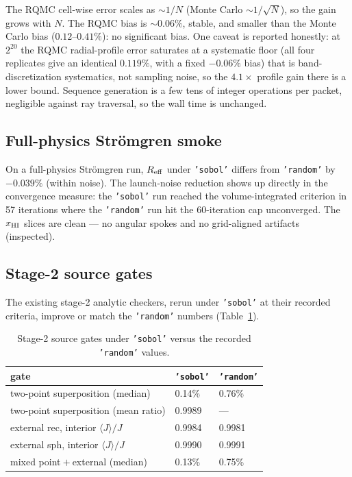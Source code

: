\documentclass[english,a4paper]{my_memo}
\newcommand{\code}[1]{\texttt{#1}}
\begin{document}
The RQMC cell-wise error scales as $\sim 1/N$ (Monte Carlo $\sim 1/\sqrt{N}$),
so the gain grows with $N$.  The RQMC bias is $\sim 0.06\%$, stable, and smaller
than the Monte Carlo bias ($0.12$--$0.41\%$): no significant bias.  One caveat is
reported honestly: at $2^{20}$ the RQMC radial-profile error saturates at a
systematic floor (all four replicates give an identical $0.119\%$, with a fixed
$-0.06\%$ bias) that is band-discretization systematics, not sampling noise, so
the $4.1\times$ profile gain there is a lower bound.  Sequence generation is a
few tens of integer operations per packet, negligible against ray traversal, so
the wall time is unchanged.

\subsection{Full-physics Str\"omgren smoke}
On a full-physics Str\"omgren run, $R_{\rm eff}$ under \code{'sobol'} differs
from \code{'random'} by $-0.039\%$ (within noise).  The launch-noise reduction
shows up directly in the convergence measure: the \code{'sobol'} run reached the
volume-integrated criterion in 57 iterations where the \code{'random'} run hit
the 60-iteration cap unconverged.  The $x_{\rm HI}$ slices are clean --- no
angular spokes and no grid-aligned artifacts (inspected).

\subsection{Stage-2 source gates}
The existing stage-2 analytic checkers, rerun under \code{'sobol'} at their
recorded criteria, improve or match the \code{'random'} numbers
(Table~\ref{tab:stage2}).

\begin{table}[htbp]
\centering
\small
\caption{Stage-2 source gates under \code{'sobol'} versus the recorded
\code{'random'} values.}
\label{tab:stage2}
\begin{tabular}{lll}
\toprule
gate & \code{'sobol'} & \code{'random'} \\
\midrule
two-point superposition (median) & 0.14\% & 0.76\% \\
two-point superposition (mean ratio) & 0.9989 & --- \\
external rec, interior $\langle J\rangle/J$ & 0.9984 & 0.9981 \\
external sph, interior $\langle J\rangle/J$ & 0.9990 & 0.9991 \\
mixed point${}+{}$external (median) & 0.13\% & 0.75\% \\
\bottomrule
\end{tabular}
\end{table}
\end{document}
